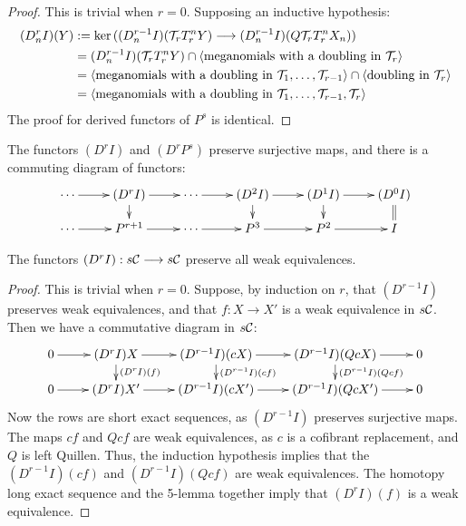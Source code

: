 \documentclass[10pt]{article}
\newcommand{\Comm}{\calC}
\begin{document}
\begin{convergenceOLD}
\begin{lem}
\end{lem}
\begin{proof}
This is trivial when $r=0$. Supposing an inductive hypothesis:
\begin{alignat*}{2}
(D^r_nI)(Y)
&:=
\ker((D^{r-1}_nI)(\calT_r T_r^n Y)\to (D^{r-1}_nI) (Q\calT_rT_r^n X_n))%
\\
&=
(D^{r-1}_nI)(\calT_r T_r^n Y)\cap\langle \textup{meganomials with a doubling in $\calT_r$}\rangle\\
&=
\langle \textup{meganomials with a doubling in $\calT_1,\ldots,\calT_{r-1}$}\rangle\cap\langle \textup{doubling in $\calT_r$}\rangle\\
&=
\langle \textup{meganomials with a doubling in $\calT_1,\ldots,\calT_{r-1},\calT_{r}$}\rangle
\end{alignat*}
The proof for derived functors of $P^{s}$ is identical.
\end{proof}
\begin{cor}\label{towerWithPowers}
The functors $(D^rI)$ and $(D^rP^{s})$ preserve surjective maps, and there is a commuting diagram of functors:
\[\xymatrix@R=4mm{
\cdots 
\ar[r]
&%
(D^rI)
\ar[r]
\ar[d]
&%
\cdots \ar[r]
&%
(D^2I)
\ar[r]
\ar[d]
&%
(D^1I)
\ar[r]
\ar[d]&%
(D^0I)
\ar@{=}[d]
\\%
\cdots
\ar[r]
&%
P^{r+1}
\ar[r]
&%
\cdots 
\ar[r]&%
P^3
\ar[r]
&P^2
\ar[r]
&%
I%
}\]
\end{cor}
\begin{cor}\label{towerIsHomotopical}
The functors $(D^rI):s\Comm\to s\Comm$ preserve all weak equivalences.
\end{cor}
\begin{proof}
This is trivial when $r=0$. Suppose, by induction on $r$, that $(D^{r-1}I)$ preserves weak equivalences, and that $f:X\to X'$ is a weak equivalence in $s\Comm$. Then we have a commutative diagram in $s\Comm$:
\[\xymatrix@R=4mm{
0\ar[r]&
(D^rI)X\ar[d]^{(D^rI)(f)}\ar[r]&
(D^{r-1}I)(cX)\ar[d]^{(D^{r-1}I)(cf)}\ar[r]&
(D^{r-1}I)(QcX)\ar[d]^{(D^{r-1}I)(Qcf)}\ar[r]&
0\\0\ar[r]&
(D^rI)X'\ar[r]&
(D^{r-1}I)(cX')\ar[r]&
(D^{r-1}I)(QcX')\ar[r]&
0
}\]
Now the rows are short exact sequences, as $(D^{r-1}I)$ preserves surjective maps. The maps $cf$ and $Qcf$ are weak equivalences, as $c$ is a cofibrant replacement, and $Q$ is left Quillen. Thus, the induction hypothesis implies that the $(D^{r-1}I)(cf)$ and $(D^{r-1}I)(Qcf)$ are weak equivalences. The homotopy long exact sequence and the 5-lemma together imply that ${(D^rI)(f)}$ is a weak equivalence.
\end{proof}


\end{convergenceOLD}
\end{document}
